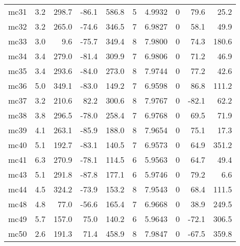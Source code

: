 \documentclass{article}
\begin{document}
\begin{longtable}{lrrrrrrrrr}
  mc31 &  3.2 &  298.7 & -86.1 &   586.8 &   5 &   4.9932 &       0 &     79.6 &      25.2 \\
  mc32 &  3.2 &  265.0 & -74.6 &   346.5 &   7 &   6.9827 &       0 &     58.1 &      49.9 \\
  mc33 &  3.0 &    9.6 & -75.7 &   349.4 &   8 &   7.9800 &       0 &     74.3 &     180.6 \\
  mc34 &  3.4 &  279.0 & -81.4 &   309.9 &   7 &   6.9806 &       0 &     71.2 &      46.9 \\
  mc35 &  3.4 &  293.6 & -84.0 &   273.0 &   8 &   7.9744 &       0 &     77.2 &      42.6 \\
  mc36 &  5.0 &  349.1 & -83.0 &   149.2 &   7 &   6.9598 &       0 &     86.8 &     111.2 \\
  mc37 &  3.2 &  210.6 &  82.2 &   300.6 &   8 &   7.9767 &       0 &    -82.1 &      62.2 \\
  mc38 &  3.8 &  296.5 & -78.0 &   258.4 &   7 &   6.9768 &       0 &     69.5 &      71.9 \\
  mc39 &  4.1 &  263.1 & -85.9 &   188.0 &   8 &   7.9654 &       0 &     75.1 &      17.3 \\
  mc40 &  5.1 &  192.7 & -83.1 &   140.5 &   7 &   6.9573 &       0 &     64.9 &     351.2 \\
  mc41 &  6.3 &  270.9 & -78.1 &   114.5 &   6 &   5.9563 &       0 &     64.7 &      49.4 \\
  mc43 &  5.1 &  291.8 & -87.8 &   177.1 &   6 &   5.9746 &       0 &     79.2 &       6.6 \\
  mc44 &  4.5 &  324.2 & -73.9 &   153.2 &   8 &   7.9543 &       0 &     68.4 &     111.5 \\
  mc48 &  4.8 &   77.0 & -56.6 &   165.4 &   7 &   6.9668 &       0 &     38.9 &     249.5 \\
  mc49 &  5.7 &  157.0 &  75.0 &   140.2 &   6 &   5.9643 &       0 &    -72.1 &     306.5 \\
  mc50 &  2.6 &  191.3 &  71.4 &   458.9 &   8 &   7.9847 &       0 &    -67.5 &     359.8 \\
\end{longtable}
\end{document}
